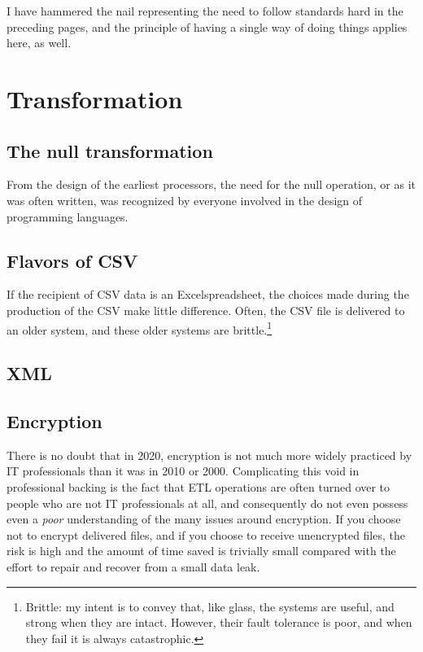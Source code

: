 \documentclass[11pt,letterpaper,twosided]{memoir}
\begin{document}
I have hammered the nail representing the need to follow standards 
hard in the preceding pages, and the principle of having a single
way of doing things applies here, as well.

\section{Transformation}

\subsection{The null transformation}

From the design of the earliest processors, the need for the null 
operation, or  as it was often written, was recognized by
everyone involved in the design of programming languages. 

\subsection{Flavors of CSV}

If the recipient of CSV data is an Excel\CircleR\thinspace spreadsheet,
the choices made during the production of the CSV make little 
difference. Often, the CSV file is delivered to an older system, and
these older systems are brittle.\footnote{Brittle: my intent is to
convey that, like glass, the systems are useful, and strong when they are intact.
However, their fault tolerance is poor, and when they fail it is
always catastrophic.}

\subsection{XML}

\subsection{Encryption}

There is no doubt that in 2020, encryption is not much more widely
practiced by IT professionals than it was in 2010 or 2000.
Complicating this void in professional backing is the fact
that ETL operations are often turned over to people who are not IT
professionals at all, and consequently do not even possess even a
\emph{poor} understanding of the many issues around encryption.
If you choose not to encrypt delivered files, and if you choose to
receive unencrypted files, the risk is high and the amount of time
saved is trivially small compared with the effort to repair and
recover from a small data leak.
\end{document}
